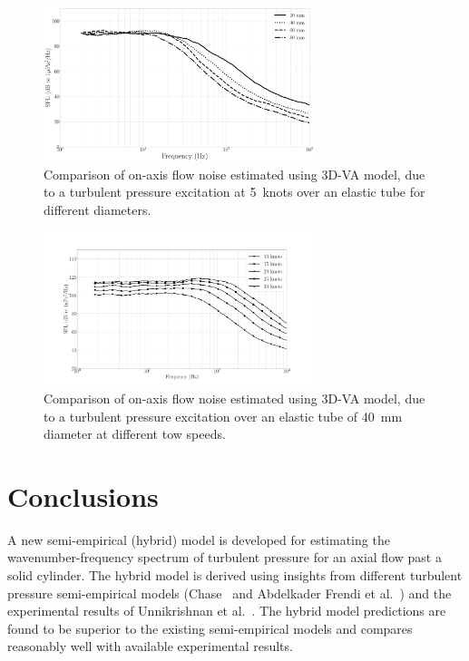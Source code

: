 \documentclass[twocolumn,10pt]{asme2ej}
\begin{document}
\begin{figure}[h]
    \centering
    \includegraphics[width=3.1in]{figure/Comparison_of_flow_noise_3D_different_dia.pdf}
    \caption{Comparison of on-axis flow noise estimated using 3D-VA model, due to a turbulent pressure excitation at 5~knots over an elastic tube for different diameters.}
    \label{flow noise diff dia 3d}
\end{figure}

\begin{figure}[h]
    \centering
    \includegraphics[width=3.1in]{figure/Comparison_of_flow_noise_3D_Different_speed.pdf}
    \caption{Comparison of on-axis flow noise estimated using 3D-VA model, due to a turbulent pressure excitation over an elastic tube of 40~mm diameter at different tow speeds.}
    \label{flow noise diff speed 3d}
\end{figure}


\section{Conclusions}
A new semi-empirical (hybrid) model is developed for estimating the wavenumber-frequency spectrum of turbulent pressure for an axial flow past a solid cylinder. The hybrid model is derived using insights from different turbulent pressure semi-empirical models (Chase~\cite{Chase1981} and Abdelkader Frendi et al.~\cite{frendi2020}) and the experimental results of Unnikrishnan et al.~\cite{Unni2011}. The hybrid model predictions are found to be superior to the existing semi-empirical models and compares reasonably well with available experimental results. 
\end{document}
